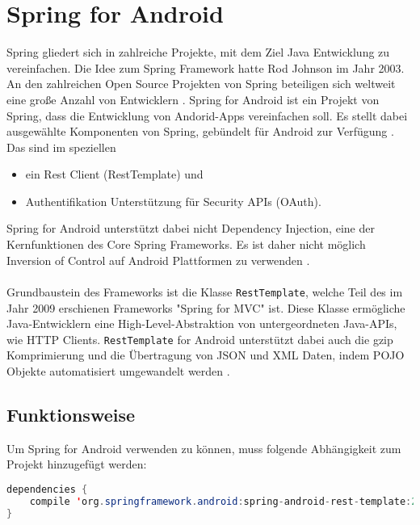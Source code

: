 \section{Spring for Android}
Spring gliedert sich in zahlreiche Projekte, mit dem Ziel Java Entwicklung zu vereinfachen. Die Idee zum Spring Framework hatte Rod Johnson im Jahr 2003. An den zahlreichen Open Source Projekten von Spring  beteiligen sich weltweit eine große Anzahl von Entwicklern \cite{springITWissen}. Spring for Android ist ein Projekt von Spring, dass die Entwicklung von Andorid-Apps vereinfachen soll. Es stellt dabei ausgewählte Komponenten von Spring, gebündelt für Android zur Verfügung \cite{springForAndroid:website}. Das sind im speziellen 

\begin{itemize}
	\item ein Rest Client (RestTemplate) und
	\item Authentifikation Unterstützung für Security APIs (OAuth).
\end{itemize}

Spring for Android unterstützt dabei nicht Dependency Injection, eine der Kernfunktionen des Core Spring Frameworks. Es ist daher nicht möglich Inversion of Control auf Android Plattformen zu verwenden \cite{springForAndroid:dahanne}.
\\\\
Grundbaustein des Frameworks ist die Klasse \texttt{RestTemplate}, welche Teil des im Jahr 2009 erschienen Frameworks "Spring for MVC" ist. Diese Klasse ermögliche Java-Entwicklern eine High-Level-Abstraktion von untergeordneten Java-APIs, wie HTTP Clients. \texttt{RestTemplate} for Android unterstützt dabei auch die gzip Komprimierung und die Übertragung von JSON und XML Daten, indem POJO Objekte automatisiert umgewandelt werden \cite{springForAndroid:dahanne}.

\subsection{Funktionsweise}
Um Spring for Android verwenden zu können, muss folgende Abhängigkeit zum Projekt hinzugefügt werden:

\begin{lstlisting}[language=java, caption={app\textbackslash build.gradle},label=dependenciesSpring for Android]
dependencies {
	compile 'org.springframework.android:spring-android-rest-template:2.0.0.M1'
}
\end{lstlisting}

